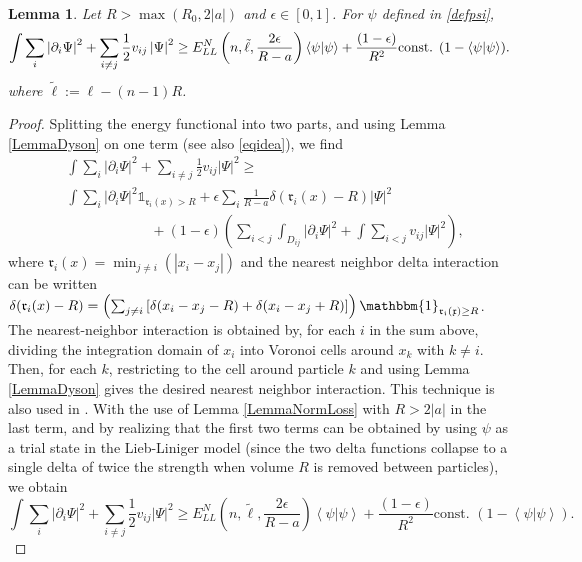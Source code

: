 \documentclass[a4paper,11pt]{article}
\newcommand{\abs}[1]{\left\lvert #1 \right\rvert}
\renewcommand{\braket}[1]{\left\langle#1\right\rangle}
\newtheorem{lemma}[theorem]{Lemma}
\numberwithin{equation}{section}
\begin{document}
	
	\begin{lemma}\label{LemmaNormBoundEpsilon}
		Let $R>\max\left(R_0,2\abs{a}\right) $ and $ \epsilon\in[0,1] $. For $ \psi $ defined in \eqref{defpsi},
		\begin{equation}
			\int \sum_{i}\abs{\partial_i\Psi}^2+\sum_{i\neq j} \frac{1}{2}v_{ij}\abs{\Psi}^2\geq E_{LL}^N \left(n,\tilde{\ell},\frac{2\epsilon}{R-a}\right)\braket{\psi|\psi}+ \frac{(1-\epsilon)}{R^2}\textnormal{const. }(1-\braket{\psi|\psi}).
		\end{equation}
		where $ \tilde{\ell}:=\ell-(n-1)R $.
	\end{lemma}
	\begin{proof}
		Splitting the energy functional into two parts, and using Lemma \ref{LemmaDyson} on one term (see also \eqref{eqidea}), we find 
		\begin{equation}
			\begin{aligned}
				&\int \sum_{i}\abs{\partial_i\Psi}^2+\sum_{i\neq j} \frac{1}{2}v_{ij}\abs{\Psi}^2\geq\\ &\int\sum_{i}\abs{\partial_i\Psi}^2\mathds{1}_{\mathfrak{r}_i(x)>R}+\epsilon\sum_{i}\frac{1}{R-a}\delta(\mathfrak{r}_i(x)-R)\abs{\Psi}^2\\&\qquad\qquad\qquad+ (1-\epsilon)\left(\sum_{i<j}\int_{D_{ij}}\abs{\partial_i \Psi}^2+\int\sum_{i<j} v_{ij} \abs{\Psi}^2\right),
			\end{aligned}
		\end{equation}
		where $ \mathfrak{r}_i(x)=\min_{j\neq i}(\abs{x_i-x_j}) $ and the nearest neighbor delta interaction can be written $\delta(\mathfrak{r}_i(x)-R)=\left(\sum_{j\neq i}\left[\delta(x_i-x_j-R)+\delta(x_i-x_j+R)\right]\right)\mathbbm{1}_{\mathfrak{r_i(x)}\geq R}$. The nearest-neighbor interaction is obtained by, for each $i$ in the sum above, dividing the integration domain of $x_i$ into Voronoi cells around $x_k$ with $k\neq i$. Then, for each $k$, restricting to the cell around particle $ k $ and using Lemma \ref{LemmaDyson} gives the desired nearest neighbor interaction. This technique is also used in \cite{lieb2006mathematics}.
		With the use of Lemma \ref{LemmaNormLoss} with $ R>2\abs{a} $ in the last term, and by realizing that the first two terms can be obtained by using $ \psi $ as a trial state in the Lieb-Liniger model (since the two delta functions collapse to a single delta of twice the strength when volume $R$ is removed between particles), we obtain\begin{equation}
			\int \sum_{i}\abs{\partial_i\Psi}^2+\sum_{i\neq j} \frac{1}{2}v_{ij}\abs{\Psi}^2\geq E_{LL}^N \left(n,\tilde{\ell},\frac{2\epsilon}{R-a}\right)\braket{\psi|\psi}+ \frac{(1-\epsilon)}{R^2}\text{const. }(1-\braket{\psi|\psi}).
		\end{equation}
	\end{proof}
	
\end{document}

